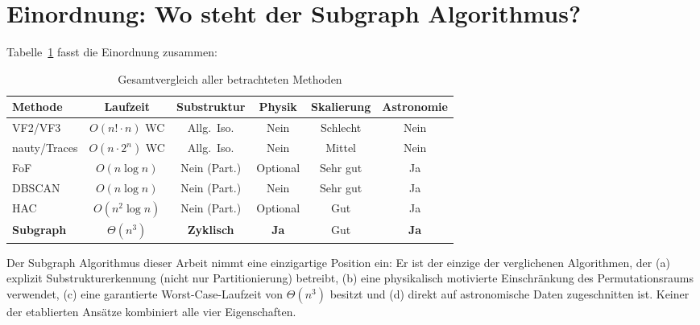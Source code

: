 ﻿\documentclass[a4paper,12pt]{report}
\theoremstyle{definition}
\begin{document}
\section{Einordnung: Wo steht der Subgraph Algorithmus?}
\label{sec:related_fazit}

Tabelle~\ref{tab:gesamtvergleich} fasst die Einordnung zusammen:

\begin{table}[H]
\centering
\caption{Gesamtvergleich aller betrachteten Methoden}
\label{tab:gesamtvergleich}
\begin{tabular}{lccccc}
\toprule
Methode & Laufzeit & Substruktur & Physik & Skalierung & Astronomie \\
\midrule
VF2/VF3             & $O(n! \cdot n)$ WC   & Allg.\ Iso. & Nein & Schlecht & Nein \\
nauty/Traces        & $O(n \cdot 2^n)$ WC  & Allg.\ Iso. & Nein & Mittel   & Nein \\
FoF                 & $O(n \log n)$        & Nein (Part.)& Optional & Sehr gut & Ja  \\
DBSCAN              & $O(n \log n)$        & Nein (Part.)& Nein & Sehr gut & Ja  \\
HAC                 & $O(n^2 \log n)$      & Nein (Part.)& Optional & Gut   & Ja  \\
\textbf{Subgraph} & $\Theta(n^3)$ & \textbf{Zyklisch} & \textbf{Ja} & Gut & \textbf{Ja} \\
\bottomrule
\end{tabular}
\end{table}

Der Subgraph Algorithmus dieser Arbeit nimmt eine einzigartige Position ein: Er ist der einzige der verglichenen Algorithmen, der (a) explizit Substrukturerkennung (nicht nur Partitionierung) betreibt, (b) eine physikalisch motivierte Einschränkung des Permutationsraums verwendet, (c) eine garantierte Worst-Case-Laufzeit von $\Theta(n^3)$ besitzt und (d) direkt auf astronomische Daten zugeschnitten ist. Keiner der etablierten Ansätze kombiniert alle vier Eigenschaften.
\end{document}
